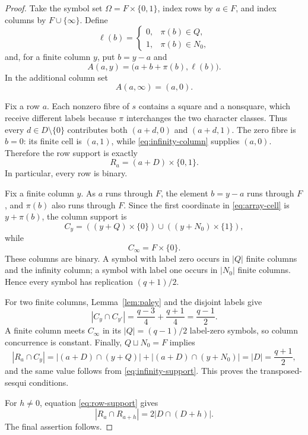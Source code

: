 \documentclass[11pt]{article}
\theoremstyle{definition}
\theoremstyle{remark}
\begin{document}
\begin{proof}
Take the symbol set \(\Omega=F\times\{0,1\}\), index rows by \(a\in F\), and
index columns by \(F\cup\{\infty\}\).  Define
\[
 \ell(b)=
 \begin{cases}
 0,&\pi(b)\in Q,\\
 1,&\pi(b)\in N_0,
 \end{cases}
\]
and, for a finite column \(y\), put \(b=y-a\) and
\begin{equation}
 A(a,y)=\bigl(a+b+\pi(b),\ell(b)\bigr).
 \label{eq:array-cell}
\end{equation}
In the additional column set
\begin{equation}
 A(a,\infty)=(a,0).
 \label{eq:infinity-column}
\end{equation}

Fix a row \(a\).  Each nonzero fibre of \(s\) contains a square and a
nonsquare, which receive different labels because \(\pi\) interchanges the
two character classes.  Thus every \(d\in D\setminus\{0\}\) contributes both
\((a+d,0)\) and \((a+d,1)\).  The zero fibre is \(b=0\): its finite cell is
\((a,1)\), while \eqref{eq:infinity-column} supplies \((a,0)\).  Therefore
the row support is exactly
\begin{equation}
 R_a=(a+D)\times\{0,1\}.
 \label{eq:row-support}
\end{equation}
In particular, every row is binary.

Fix a finite column \(y\).  As \(a\) runs through \(F\), the element
\(b=y-a\) runs through \(F\), and \(\pi(b)\) also runs through \(F\).  Since
the first coordinate in \eqref{eq:array-cell} is \(y+\pi(b)\), the column
support is
\begin{equation}
 C_y=((y+Q)\times\{0\})\cup((y+N_0)\times\{1\}),
 \label{eq:finite-column-support}
\end{equation}
while
\begin{equation}
 C_\infty=F\times\{0\}.
 \label{eq:infinity-support}
\end{equation}
These columns are binary.  A symbol with label zero occurs in \(|Q|\) finite
columns and the infinity column; a symbol with label one occurs in \(|N_0|\)
finite columns.  Hence every symbol has replication \((q+1)/2\).

For two finite columns, Lemma~\ref{lem:paley} and the disjoint labels give
\[
 |C_y\cap C_{y'}|
 =\frac{q-3}{4}+\frac{q+1}{4}=\frac{q-1}{2}.
\]
A finite column meets \(C_\infty\) in its \(|Q|=(q-1)/2\) label-zero
symbols, so column concurrence is constant.  Finally, \(Q\sqcup N_0=F\)
implies
\[
 |R_a\cap C_y|
 =|(a+D)\cap(y+Q)|+|(a+D)\cap(y+N_0)|
 =|D|=\frac{q+1}{2},
\]
and the same value follows from \eqref{eq:infinity-support}.  This proves the
transposed-sesqui conditions.

For \(h\ne0\), equation \eqref{eq:row-support} gives
\begin{equation}
 |R_a\cap R_{a+h}|=2|D\cap(D+h)|.
 \label{eq:row-concurrence}
\end{equation}
The final assertion follows.
\end{proof}
\end{document}
